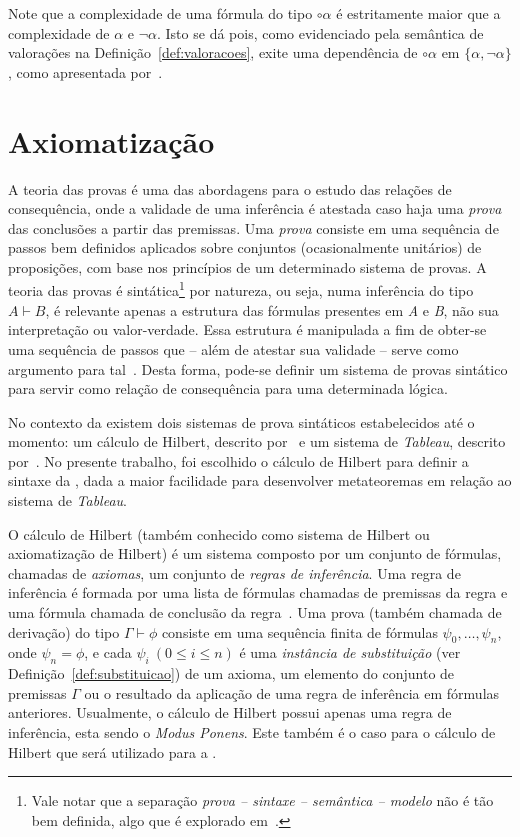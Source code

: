     Note que a complexidade de uma fórmula do tipo $\circ \alpha$ é estritamente maior que a complexidade de $\alpha$ e $\neg \alpha$. Isto se dá pois, como evidenciado pela semântica de valorações na Definição~\ref{def:valoracoes}, exite uma dependência de $\circ \alpha$ em $\{\alpha, \neg \alpha\}$, como apresentada por~.

\section{Axiomatização}
\label{sec:axiomatizacao}

    A teoria das provas é uma das abordagens para o estudo das relações de consequência, onde a validade de uma inferência é atestada caso haja uma \textit{prova} das conclusões a partir das premissas. Uma \textit{prova} consiste em uma sequência de passos bem definidos aplicados sobre conjuntos (ocasionalmente unitários) de proposições, com base nos princípios de um determinado sistema de provas. A teoria das provas é sintática\footnote{Vale notar que a separação \textit{prova {--} sintaxe {--} semântica {--} modelo} não é tão bem definida, algo que é explorado em~.} por natureza, ou seja, numa inferência do tipo $A \vdash B$, é relevante apenas a estrutura das fórmulas presentes em \textit{A} e \textit{B}, não sua interpretação ou valor-verdade. Essa estrutura é manipulada a fim de obter-se uma sequência de passos que {--} além de atestar sua validade {--} serve como argumento para tal~\cite{sep-logical-consequence}. Desta forma, pode-se definir um sistema de provas sintático para servir como relação de consequência para uma determinada lógica. 

    No contexto da \lfium{} existem dois sistemas de prova sintáticos estabelecidos até o momento: um cálculo de Hilbert, descrito por~ e um sistema de \textit{Tableau}, descrito por~. No presente trabalho, foi escolhido o cálculo de Hilbert para definir a sintaxe da \lfium{}, dada a maior facilidade para desenvolver metateoremas em relação ao sistema de \textit{Tableau}.

    O cálculo de Hilbert (também conhecido como sistema de Hilbert ou axiomatização de Hilbert) é um sistema composto por um conjunto de fórmulas, chamadas de \textit{axiomas}, um conjunto de \textit{regras de inferência}. Uma regra de inferência é formada por uma lista de fórmulas chamadas de premissas da regra e uma fórmula chamada de conclusão da regra~\cite{Restall1999-RESAIT-4}. Uma prova (também chamada de derivação) do tipo $\Gamma \vdash \phi$ consiste em uma sequência finita de fórmulas \(\psi_0, \dots, \psi_n\), onde \(\psi_n = \phi\), e cada  $\psi_i\ (0 \leq i \leq n)$ é uma \textit{instância de substituição} (ver Definição~\ref{def:substituicao}) de um axioma, um elemento do conjunto de premissas $\Gamma$ ou o resultado da aplicação de uma regra de inferência em fórmulas anteriores. Usualmente, o cálculo de Hilbert possui apenas uma regra de inferência, esta sendo o \textit{Modus Ponens}. Este também é o caso para o cálculo de Hilbert que será utilizado para a \lfium{}.
    
